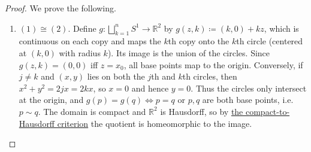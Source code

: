 	\begin{proof}
	  We prove the following. 
		\begin{enumerate}
		  \item $(1) \cong (2)$. Define $g: \bigsqcup_{k=1}^n S^1 \rightarrow \mathbb{R}^2$ by $g(z, k) \coloneqq (k, 0) + k z$, which is continuous on each copy and maps the $k$th copy onto the $k$th circle (centered at $(k, 0)$ with radius $k$). Its image is the union of the circles. Since $g(z, k) = (0, 0)$ iff $z = x_0$, all base points map to the origin. Conversely, if $j \neq k$ and $(x, y)$ lies on both the $j$th and $k$th circles, then $x^2 + y^2 = 2jx = 2kx$, so $x = 0$ and hence $y = 0$. Thus the circles only intersect at the origin, and $g(p) = g(q) \iff p = q$ or $p, q$ are both base points, i.e. $p \sim q$. The domain is compact and $\mathbb{R}^2$ is Hausdorff, so by \hyperref[thm:compact_hausdorff_quotient]{the compact-to-Hausdorff criterion} the quotient is homeomorphic to the image. 
		\end{enumerate}
	\end{proof}

